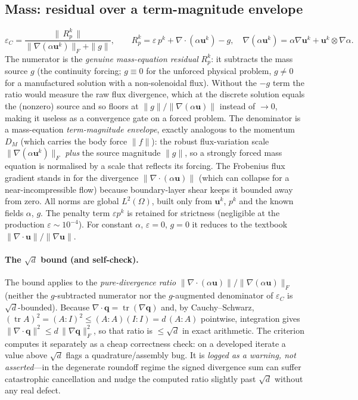 \documentclass{article}
\begin{document}
\subsection{Mass: residual over a term-magnitude envelope}
\begin{equation}
    \label{eq:cc-epsC}
    \varepsilon_C = \frac{\bigl\|\,R_p^k\,\bigr\|}
                         {\|\nabla(\alpha\boldsymbol{u}^k)\|_F + \|g\|},
    \qquad
    R_p^k = \varepsilon\,p^k + \nabla\!\cdot\!(\alpha\boldsymbol{u}^k) - g ,
    \quad
    \nabla(\alpha\boldsymbol{u}^k)=\alpha\nabla\boldsymbol{u}^k
        + \boldsymbol{u}^k\!\otimes\!\nabla\alpha .
\end{equation}
The numerator is the \emph{genuine mass-equation residual} $R_p^k$: it subtracts the mass source
$g$ (the continuity forcing; $g\equiv0$ for the unforced physical problem, $g\neq0$ for a manufactured
solution with a non-solenoidal flux). Without the $-g$ term the ratio would measure the raw flux
divergence, which at the discrete solution equals the (nonzero) source and so floors at
$\|g\|/\|\nabla(\alpha\boldsymbol{u})\|$ instead of $\to0$, making it useless as a convergence gate on
a forced problem. The denominator is a mass-equation \emph{term-magnitude envelope}, exactly analogous
to the momentum $D_M$ (which carries the body force $\|f\|$): the robust flux-variation scale
$\|\nabla(\alpha\boldsymbol{u}^k)\|_F$ \emph{plus} the source magnitude $\|g\|$, so a strongly forced
mass equation is normalised by a scale that reflects its forcing. The Frobenius flux gradient stands
in for the divergence $\|\nabla\!\cdot\!(\alpha\boldsymbol{u})\|$ (which can collapse for a
near-incompressible flow) because boundary-layer shear keeps it bounded away from zero. All norms are
global $L^2(\Omega)$, built only from $\boldsymbol{u}^k$, $p^k$ and the known fields $\alpha$, $g$. The
penalty term $\varepsilon p^k$ is retained for strictness (negligible at the production
$\varepsilon\sim10^{-4}$). For constant $\alpha$, $\varepsilon=0$, $g=0$ it reduces to the textbook
$\|\nabla\!\cdot\!\boldsymbol{u}\|/\|\nabla\boldsymbol{u}\|$.

\paragraph{The $\sqrt{d}$ bound (and self-check).} The bound applies to the \emph{pure-divergence
ratio} $\|\nabla\!\cdot\!(\alpha\boldsymbol{u})\|/\|\nabla(\alpha\boldsymbol{u})\|_F$ (neither the
$g$-subtracted numerator nor the $g$-augmented denominator of $\varepsilon_C$ is $\sqrt{d}$-bounded).
Because $\nabla\!\cdot\!\boldsymbol{q}=\operatorname{tr}(\nabla\boldsymbol{q})$ and, by
Cauchy--Schwarz, $(\operatorname{tr}A)^2=(A:I)^2\le(A:A)(I:I)=d\,(A:A)$ pointwise, integration gives
$\|\nabla\!\cdot\!\boldsymbol{q}\|^2\le d\,\|\nabla\boldsymbol{q}\|_F^2$, so that ratio is
$\le\sqrt{d}$ in exact arithmetic. The criterion computes it separately as a cheap correctness check:
on a developed iterate a value above $\sqrt{d}$ flags a quadrature/assembly bug. It is \emph{logged as
a warning, not asserted}---in the degenerate roundoff regime the signed divergence sum can suffer
catastrophic cancellation and nudge the computed ratio slightly past $\sqrt{d}$ without any real
defect.
\end{document}
